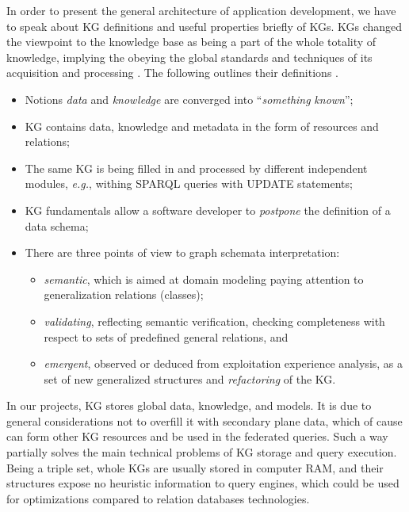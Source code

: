 \documentclass[a4paper]{jctart19a}
\begin{document}
In order to present the general architecture of application development, we have to speak about KG definitions and useful properties briefly of KGs.
KGs changed the viewpoint to the knowledge base as being a part of the whole totality of knowledge, implying the obeying the global standards and techniques of its acquisition and processing \cite{hogan}.  The following outlines their definitions \cite{hogan}.
 \begin{itemize}
  \item Notions \emph{data} and \emph{knowledge} are converged into ``\emph{something} \emph{known}'';
  \item KG contains data, knowledge and metadata in the form of resources and relations;
  \item The same KG is being filled in and processed by different independent modules, \emph{e.g.}, withing SPARQL queries with UPDATE statements;
  \item KG fundamentals allow a software developer to \emph{postpone} the definition of a data schema;
  \item There are three points of view to graph schemata interpretation:
    \begin{itemize}
    \item \emph{semantic}, which is aimed at domain modeling paying attention to generalization relations (classes);
    \item \emph{validating}, reflecting semantic verification, checking completeness with respect to sets of predefined general relations, and
    \item \emph{emergent}, observed or deduced from exploitation experience analysis, as a set of new generalized structures and \emph{refactoring} of the KG.
    \end{itemize}
  \end{itemize}

In our projects, KG stores global data, knowledge, and models.  It is due to general considerations not to overfill it with secondary plane data, which of cause can form other KG resources and be used in the federated queries.  Such a way partially solves the main technical problems of KG storage and query execution.  Being a triple set, whole KGs are usually stored in computer RAM, and their structures expose no heuristic information to query engines, which could be used for optimizations compared to relation databases technologies.
\end{document}
